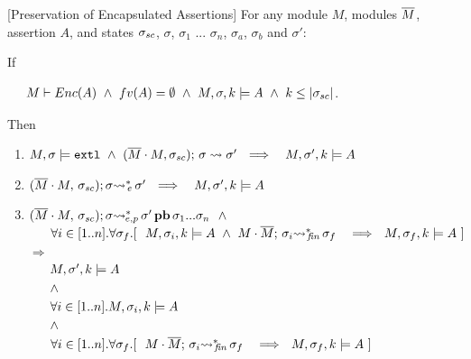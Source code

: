 \begin{auxLemma}
\label{lemma:external_exec_preserves_more}[Preservation of Encapsulated Assertions]
For any module $M$, modules $\overline{M}$,  assertion  $A$, and 
 states $\sigma_{sc}$, $\sigma$, $\sigma_1$ ... $\sigma_n$, $\sigma_a$, $\sigma_b$ and $\sigma'$:

\noindent
If

\noindent
 $\strut \hspace{.5cm} M \vdash \encaps A \   \wedge   \ fv(A)=\emptyset \  \wedge \ 
\satDAssertFrom M {\sigma} k A \ \wedge \ k \leq \DepthSt {\sigma\bd}$. 

\noindent
Then

\begin{enumerate}
\item
\label{lemma:external_exec_preserves_more:one}
$  M, \sigma  \models \mbox{\normalfont{\texttt{extl}}} \ \wedge \  (\overline{M}\cdot M, \sigma_{sc});\, {\sigma} \rightsquigarrow \sigma' 
\ \ \Longrightarrow \ \ \ M,\sigma' ,{k} \models {A} $

\item
$   (\overline{M}\cdot M,\, {\sigma_{sc}}); \sigma{\rightsquigarrow^*}\!\!_{e}\, \sigma' 
\ \ \Longrightarrow \ \ \ M,\sigma' ,{k} \models {A} $

\item
\label{lemma:external_exec_preserves_more:three}
$ \WithExtPub {\Mtwo\cdot M} {\sigma\bd}  {\sigma}  {\sigma'} {\sigma_1...\sigma_n}\ \ \wedge $\\
 $\strut \ \ \ \  \  \forall i\in [1..n]. \forall \sigma_{f}.[ \ \  \satDAssertFrom M {\sigma_i} k A  \ \wedge \  \leadstoBoundedStarFin {M\cdot \Mtwo}  {\sigma_i}  {\sigma_{f}} \ 
\ \ \Longrightarrow \ \  \satDAssertFrom M {\sigma_f} k A \ ]$\\
$\Longrightarrow $
\\
 $\strut \ \ \ \  \ M,\sigma' ,{k} \models {A}  $ 
 \\
  $\strut \ \ \ \  \  \wedge $
  \\
 $\strut \ \ \ \  \  \forall i\in [1..n].   M,\sigma_i ,{k} \models {A}  $
 \\
 $\strut \ \ \ \  \  \wedge $
  \\
 $\strut \ \ \ \  \  \forall i\in [1..n]. \forall \sigma_{f}.[ \ \    \leadstoBoundedStarFin {M\cdot \Mtwo}  {\sigma_i}  {\sigma_{f}} \ 
\ \ \Longrightarrow \ \  \satDAssertFrom M {\sigma_f} k A \ ]$ 


\end{enumerate}

\end{auxLemma}

